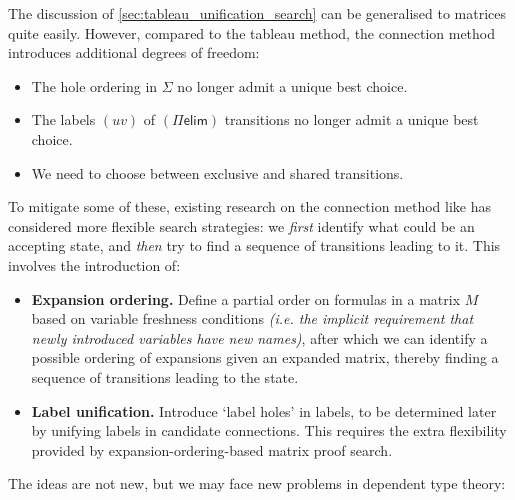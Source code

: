 \documentclass[twoside]{report}
\begin{document}
The discussion of \cref{sec:tableau_unification_search} can be generalised to matrices quite easily. However, compared to the tableau method, the connection method introduces additional degrees of freedom:
\begin{itemize}[noitemsep]
    \item The hole ordering in $\Sigma$ no longer admit a unique best choice.
    \item The labels $(uv)$ of $(\Pi\mathsf{elim})$ transitions no longer admit a unique best choice.
    \item We need to choose between exclusive and shared transitions.
\end{itemize}
To mitigate some of these, existing research on the connection method like \cite{wallen1987automated} has considered more flexible search strategies: we \emph{first} identify what could be an accepting state, and \emph{then} try to find a sequence of transitions leading to it. This involves the introduction of:
\begin{itemize}
    \item \textbf{Expansion ordering.} Define a partial order on formulas in a matrix $M$ based on variable freshness conditions \emph{(i.e. the implicit requirement that newly introduced variables have new names)}, after which we can identify a possible ordering of expansions given an expanded matrix, thereby finding a sequence of transitions leading to the state.

    \item \textbf{Label unification.} Introduce `label holes' in labels, to be determined later by unifying labels in candidate connections. This requires the extra flexibility provided by expansion-ordering-based matrix proof search.
\end{itemize}
The ideas are not new, but we may face new problems in dependent type theory:
\end{document}
